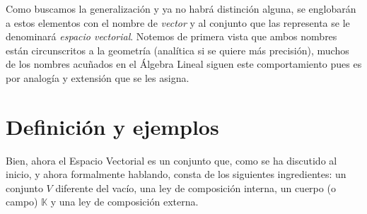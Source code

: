 \documentclass[b5paper, 11pt]{book}
\newcommand{\0}{\mathbf{0}}
\theoremstyle{estiloB}
\theoremstyle{estiloC}
\theoremstyle{estiloD}
\begin{document}
Como buscamos la generalización y ya no habrá distinción alguna, se englobarán a estos elementos con el nombre de \textit{vector} y al conjunto que las representa se le denominará \textit{espacio vectorial}. Notemos de primera vista que ambos nombres están circunscritos a la geometría (analítica si se quiere más precisión), muchos de los nombres acuñados en el Álgebra Lineal siguen este comportamiento pues es por analogía y extensión que se les asigna.

\section{Definición y ejemplos}
Bien, ahora el Espacio Vectorial es un conjunto que, como se ha discutido al inicio, y ahora formalmente hablando, consta de los siguientes ingredientes: un conjunto $V$ diferente del vacío, una ley de composición interna, un cuerpo (o campo) $\mathds{K}$ y una ley de composición externa.
\end{document}
